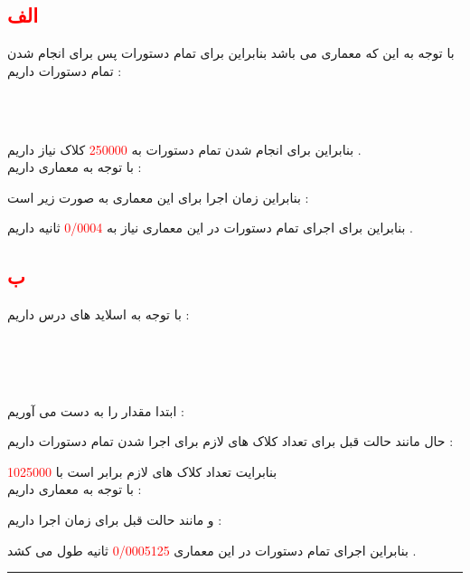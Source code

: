 \documentclass{article}
\begin{document}
\subsection*{\textcolor{red}{الف}}
با توجه به این که معماری 
می باشد بنابراین برای تمام دستورات 
\textcolor{red}{}
پس برای انجام شدن تمام دستورات 
داریم  : 
\begin{center}
	\\
	\\
\end{center}
بنابراین برای انجام شدن تمام دستورات 
به 
\textcolor{red}{250000}
کلاک نیاز داریم  . 
\\
با توجه به معماری داریم  : 
\begin{center}
\end{center}
بنابراین زمان اجرا برای این معماری به صورت زیر است  :‌
\begin{center}
\end{center}
بنابراین برای اجرای تمام دستورات 
در این معماری نیاز به 
\textcolor{red}{0/0004}
ثانیه داریم  . 
\subsection*{\textcolor{red}{ب}}
با توجه به اسلاید های درس داریم  :
\begin{center}
	\\
	\\
	\\
\end{center}
ابتدا مقدار 
را به دست می آوریم ‌:
\begin{center}
\end{center}
حال مانند حالت قبل برای تعداد کلاک های لازم برای اجرا شدن تمام دستورات 
داریم : 
\begin{center}
\end{center}
بنابرایت تعداد کلاک های لازم برابر است با 
\textcolor{red}{1025000}
\\
با توجه به معماری داریم  : 
\begin{center}
\end{center}
و مانند حالت قبل برای زمان اجرا داریم  : 
\begin{center}
\end{center}
بنابراین  اجرای تمام دستورات 
در این معماری 
\textcolor{red}{0/0005125}
ثانیه طول می کشد .  
\hrule
\end{document}
